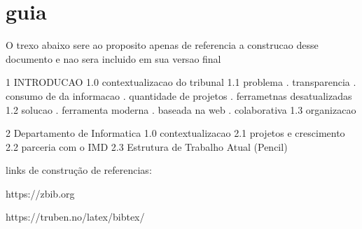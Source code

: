 \chapter[Roteiro]{guia}
\label{ch:guia}
O trexo abaixo sere ao proposito apenas de referencia a construcao desse documento e nao sera incluido em sua versao final

1 INTRODUCAO
    1.0 contextualizacao do tribunal
    1.1 problema
        . transparencia
        . consumo de da informacao
        . quantidade de projetos
        . ferrametnas desatualizadas
    1.2 solucao
        . ferramenta moderna
        . baseada na web
        . colaborativa
    1.3 organizacao

2 Departamento de Informatica
    1.0 contextualizacao
    2.1 projetos e crescimento
    2.2 parceria com o IMD
    2.3 Estrutura de Trabalho Atual (Pencil)

links de construção de referencias:

https://zbib.org

https://truben.no/latex/bibtex/
